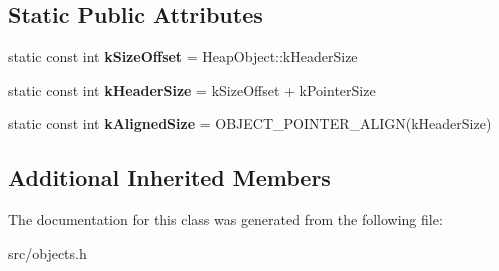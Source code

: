 \subsection*{Static Public Attributes}
\begin{DoxyCompactItemize}
\item 
\hypertarget{classv8_1_1internal_1_1_free_space_a7fd33f05c7a8d5417c28228c73f8608a}{}static const int {\bfseries k\+Size\+Offset} = Heap\+Object\+::k\+Header\+Size\label{classv8_1_1internal_1_1_free_space_a7fd33f05c7a8d5417c28228c73f8608a}

\item 
\hypertarget{classv8_1_1internal_1_1_free_space_aed2d0ffe285f32a2ec5bbc5d9821ba5e}{}static const int {\bfseries k\+Header\+Size} = k\+Size\+Offset + k\+Pointer\+Size\label{classv8_1_1internal_1_1_free_space_aed2d0ffe285f32a2ec5bbc5d9821ba5e}

\item 
\hypertarget{classv8_1_1internal_1_1_free_space_aec62349f79aba092dcb3e85f42a2de54}{}static const int {\bfseries k\+Aligned\+Size} = O\+B\+J\+E\+C\+T\+\_\+\+P\+O\+I\+N\+T\+E\+R\+\_\+\+A\+L\+I\+G\+N(k\+Header\+Size)\label{classv8_1_1internal_1_1_free_space_aec62349f79aba092dcb3e85f42a2de54}

\end{DoxyCompactItemize}
\subsection*{Additional Inherited Members}


The documentation for this class was generated from the following file\+:\begin{DoxyCompactItemize}
\item 
src/objects.\+h\end{DoxyCompactItemize}
